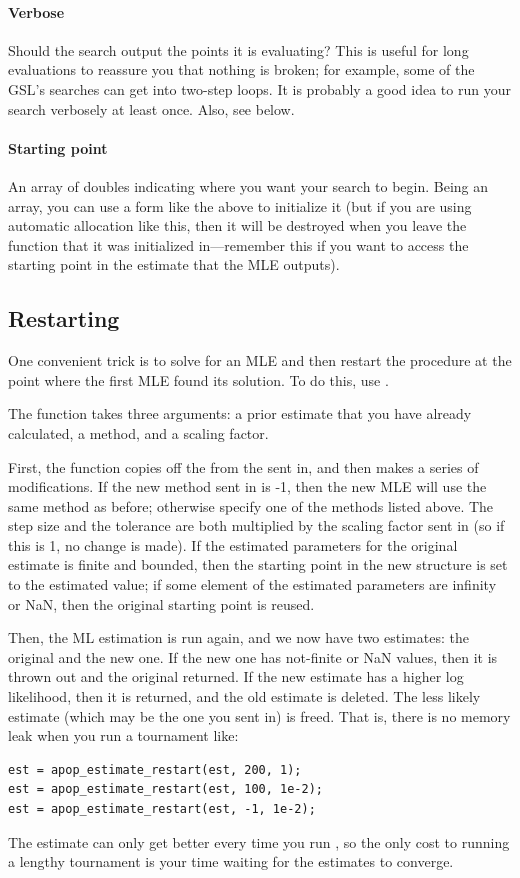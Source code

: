 \paragraph{Verbose} Should the search output the points it is evaluating?
This is useful for long evaluations to reassure you that nothing is
broken; for example, some of the GSL's searches can get into two-step loops.
It is probably a good idea to run your search verbosely at least once.
Also, see  below.

\paragraph{Starting point} An array of doubles indicating where you want
your search to begin. Being an array, you can use a form like the above
to initialize it (but if you are using automatic allocation like this, then it will be destroyed when you leave the
function that it was initialized in---remember this if you want to
access the starting point in the estimate that the MLE outputs).


\subsection{Restarting} One convenient trick is to solve for an MLE and
then restart the procedure at the point where the first MLE found its solution.
To do this, use .

The function takes three arguments: a prior estimate that you have
already calculated, a method, and a scaling factor. 

First, the function copies off the 
from the  sent in, and then makes a series of
modifications.  If the new method sent in is -1, then the new MLE will
use the same method as before; otherwise specify one of the methods
listed above. The step size and the tolerance are both multiplied by the
scaling factor sent in (so if this is 1, no change is made). If the
estimated parameters for the original estimate is finite and bounded, then 
the starting point in the new 
structure is set to the estimated value; if some element of the
estimated parameters are infinity or NaN, then the original starting
point is reused.

Then, the ML estimation is run again, and we now have two estimates: the
original and the new one. If the new one has not-finite or NaN values,
then it is thrown out and the original returned. If the new estimate 
has a higher log likelihood, then it is returned, and the old estimate
is deleted.  The less likely estimate (which may be the one you sent in) is freed. That is,
there is no memory leak when you run a tournament like:
\begin{lstlisting}
est = apop_estimate_restart(est, 200, 1);
est = apop_estimate_restart(est, 100, 1e-2);
est = apop_estimate_restart(est, -1, 1e-2);
\end{lstlisting}
The estimate can only get better every time you run
, so the only cost to running a lengthy
tournament is your time waiting for the estimates to converge.

